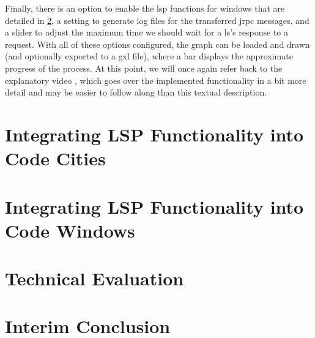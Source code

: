 \documentclass[../thesis]{subfiles}
\begin{document}
Finally, there is an option to enable the \gls{lsp} functions for \glspl{window} that are detailed in \cref{sec:intowindow}, a setting to generate log files for the transferred \gls{jrpc} messages, and a slider to adjust the maximum time we should wait for a \gls{ls}'s response to a request.
With all of these options configured, the graph can be loaded and drawn (and optionally exported to a \gls{gxl} file), where a bar displays the approximate progress of the process.
At this point, we will once again refer back to the explanatory video , which goes over the implemented functionality in a bit more detail and may be easier to follow along than this textual description.

\section{Integrating LSP Functionality into Code Cities}\label{sec:intocity}
\fxfatal{}

\section{Integrating LSP Functionality into Code Windows}\label{sec:intowindow}
\fxfatal{}

\section{Technical Evaluation}\label{sec:techeval}
\fxfatal{}


\section{Interim Conclusion}
\fxfatal{}

\end{document}
